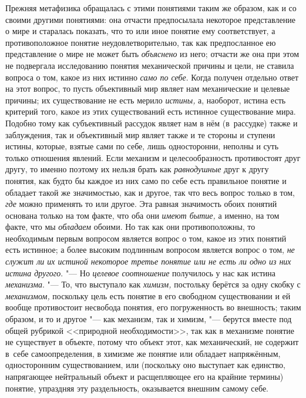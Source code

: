 Прежняя метафизика обращалась с этими понятиями таким же
образом, как и со своими другими понятиями: она отчасти предпосылала
некоторое представление о мире и старалась показать, что то или иное
понятие ему соответствует, а противоположное понятие неудовлетворительно,
так как предпосланное ею представление о мире не может быть
{\em объяснено} из него;
отчасти же она при этом не подвергала исследованию понятия механической
причины и цели, не ставила вопроса о том, какое из них истинно
{\em само по себе}. Когда
получен отдельно ответ на этот вопрос, то пусть объективный мир являет нам
механические и целевые причины; их существование не есть мерило
{\em истины,} а,
наоборот, истина есть критерий того, какое из этих существований есть
истинное существование мира. Подобно тому как субъективный рассудок являет
нам в нём (в~рассудке) также и заблуждения, так и объективный мир являет
также и те стороны и ступени истины, которые, взятые сами по себе, лишь
односторонни, неполны и суть только отношения явлений. Если механизм и
целесообразность противостоят друг другу, то именно поэтому их нельзя брать
как {\em равнодушные}
друг к другу понятия, как будто бы каждое из них само по себе
есть правильное понятие и обладает такой же значимостью, как и другое, так
что весь вопрос только в том, {\em где}
можно применять то или другое. Эта равная
значимость обоих понятий основана только на том факте, что
оба они {\em имеют бытие,}
а именно, на том факте, что мы
{\em обладаем} обоими. Но
так как они противоположны, то необходимым первым вопросом является вопрос
о том, какое из этих понятий есть истинное; а более высоким подлинным
вопросом является вопрос о том, {\em не
служит ли их истиной некоторое третье понятие или не есть ли одно из них
истина другого}. "--- Но
{\em целевое соотношение}
получилось у нас как истина
{\em механизма}. "--- То,
что выступало как {\em химизм,}
постольку берётся за одну скобку с
{\em механизмом,}
поскольку цель есть понятие в его свободном существовании и
ей вообще противостоит несвобода понятия, его погруженность во внешность;
таким образом, и то и другое "--- как механизм, так и химизм,
"--- берутся вместе под общей рубрикой <<природной
необходимости>>, так как в механизме понятие не существует в объекте, потому
что объект этот, как механический, не содержит в~себе самоопределения, в
химизме же понятие или обладает напряжённым, односторонним существованием,
или (поскольку оно выступает как единство, напрягающее нейтральный объект и
расщепляющее его на крайние термины) понятие, упраздняя эту раздельность,
оказывается внешним самому себе.

